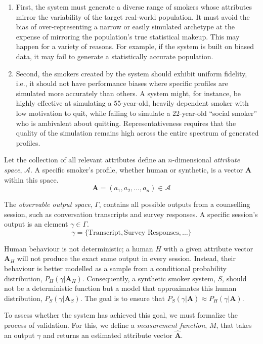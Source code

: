 \begin{enumerate}
    \item First, the system must generate a diverse range of smokers whose attributes mirror the variability of the target real-world population. It must avoid the bias of over-representing a narrow or easily simulated archetype at the expense of mirroring the population's true statistical makeup. This may happen for a variety of reasons. For example, if the system is built on biased data, it may fail to generate a statistically accurate population.

    \item Second, the smokers created by the system should exhibit uniform fidelity, i.e., it should not have performance biases where specific profiles are simulated more accurately than others. A system might, for instance, be highly effective at simulating a 55-year-old, heavily dependent smoker with low motivation to quit, while failing to simulate a 22-year-old ``social smoker'' who is ambivalent about quitting. Representativeness requires that the quality of the simulation remains high across the entire spectrum of generated profiles.
\end{enumerate}



Let the collection of all relevant attributes define an $n$-dimensional \emph{attribute space}, $\mathcal{A}$. A specific smoker's profile, whether human or synthetic, is a vector $\textbf{A}$ within this space.
$$\textbf{A} = (a_1, a_2, \ldots, a_n) \in \mathcal{A}$$

The \emph{observable output space}, $\Gamma$, contains all possible outputs from a counselling session, such as conversation transcripts and survey responses. A specific session's output is an element $\gamma \in \Gamma$.
$$\gamma = \{\text{Transcript}, \text{Survey Responses}, \ldots\}$$

Human behaviour is not deterministic; a human $H$ with a given attribute vector $\textbf{A}_H$ will not produce the exact same output in every session. Instead, their behaviour is better modelled as a sample from a conditional probability distribution, $P_H(\gamma | \textbf{A}_H)$. Consequently, a synthetic smoker system, $S$, should not be a deterministic function but a model that approximates this human distribution, $P_S(\gamma | \textbf{A}_S)$. The goal is to ensure that $P_S(\gamma | \textbf{A}) \approx P_H(\gamma | \textbf{A})$.

To assess whether the system has achieved this goal, we must formalize the process of validation. For this, we define a \emph{measurement function}, $M$, that takes an output $\gamma$ and returns an estimated attribute vector $\hat{\textbf{A}}$.

